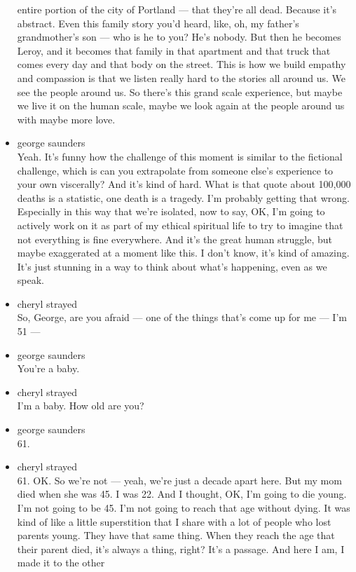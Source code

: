 \begin{itemize}
  entire portion of the city of Portland --- that they're all dead.
  Because it's abstract. Even this family story you'd heard, like, oh,
  my father's grandmother's son --- who is he to you? He's nobody. But
  then he becomes Leroy, and it becomes that family in that apartment
  and that truck that comes every day and that body on the street. This
  is how we build empathy and compassion is that we listen really hard
  to the stories all around us. We see the people around us. So there's
  this grand scale experience, but maybe we live it on the human scale,
  maybe we look again at the people around us with maybe more love.
\item
  george saunders\\
  Yeah. It's funny how the challenge of this moment is similar to the
  fictional challenge, which is can you extrapolate from someone else's
  experience to your own viscerally? And it's kind of hard. What is that
  quote about 100,000 deaths is a statistic, one death is a tragedy. I'm
  probably getting that wrong. Especially in this way that we're
  isolated, now to say, OK, I'm going to actively work on it as part of
  my ethical spiritual life to try to imagine that not everything is
  fine everywhere. And it's the great human struggle, but maybe
  exaggerated at a moment like this. I don't know, it's kind of amazing.
  It's just stunning in a way to think about what's happening, even as
  we speak.
\item
  cheryl strayed\\
  So, George, are you afraid --- one of the things that's come up for me
  --- I'm 51 ---
\item
  george saunders\\
  You're a baby.
\item
  cheryl strayed\\
  I'm a baby. How old are you?
\item
  george saunders\\
  61.
\item
  cheryl strayed\\
  61. OK. So we're not --- yeah, we're just a decade apart here. But my
  mom died when she was 45. I was 22. And I thought, OK, I'm going to
  die young. I'm not going to be 45. I'm not going to reach that age
  without dying. It was kind of like a little superstition that I share
  with a lot of people who lost parents young. They have that same
  thing. When they reach the age that their parent died, it's always a
  thing, right? It's a passage. And here I am, I made it to the other

\end{itemize}
